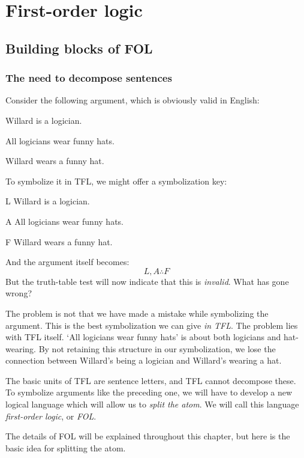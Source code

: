 \part{First-order logic}
\label{ch.FOL}
\chapter{Building blocks of FOL}\label{s:FOLBuildingBlocks}

\section{The need to decompose sentences}
Consider the following argument, which is obviously valid in English:
\begin{earg}
\label{willard1}
\item[] Willard is a logician.
\item[] All logicians wear funny hats. 
\item[\therefore] Willard wears a funny hat.
\end{earg}
To symbolize it in TFL, we might offer a symbolization key:
\begin{ekey}
\item[L] Willard is a logician.
\item[A] All logicians wear funny hats.
\item[F] Willard wears a funny hat.
\end{ekey}
And the argument itself becomes:
$$L, A \therefore F$$
But the truth-table test will now indicate that this is \emph{invalid}. What has gone wrong?

The problem is not that we have made a mistake while symbolizing the argument. This is the best symbolization we can give \emph{in TFL}. The problem lies with TFL itself. `All logicians wear funny hats' is about both logicians and hat-wearing. By not retaining this structure in our symbolization, we lose the connection between Willard's being a logician and Willard's wearing a hat.

The basic units of TFL are sentence letters, and TFL cannot decompose these. To symbolize arguments like the preceding one, we will have to develop a new logical language which will allow us to \emph{split the atom}. We will call this language \emph{first-order logic}, or \emph{FOL}. 

The details of FOL will be explained throughout this chapter, but here is the basic idea for splitting the atom.

